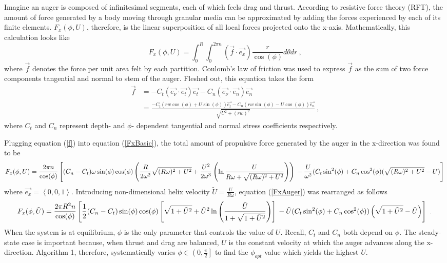 \documentclass[letterpaper, 11 pt]{article}
\begin{document}
\medskip
Imagine an auger is composed of infinitesimal segments, each of which feels drag and thrust. According to resistive force theory (RFT), the amount of force generated by a body moving through granular media can be approximated by adding the forces experienced by each of its finite elements. $F_x(\phi,U)$, therefore, is the linear superposition of all local forces projected onto the x-axis. Mathematically, this calculation looks like
\begin{equation}\label{FxBasic}
F_x(\phi,U) = \int_{0}^{R}\int_{0}^{2\pi n} (\vec{f}\cdot\vec{e_x})\frac{r}{\cos(\phi)} d\theta dr\ \text{,}
\end{equation}
where $\vec{f}$ denotes the force per unit area felt by each partition. Coulomb's law of friction was used to express $\vec{f}$ as the sum of two force components tangential and normal to stem of the auger. Fleshed out, this equation takes the form
\begin{equation}\label{f}
\begin{split} 
\vec{f} &= -C_t(\vec{e_\nu}\cdot\vec{e_t})\vec{e_t}-C_n(\vec{e_\nu}\cdot\vec
{e_n})\vec{e_n} \\
&=\frac{-C_t(rw\cos(\phi)+U\sin(\phi))\vec{e_t}-C_n(rw\sin(\phi)-U\cos(\phi))\vec{e_n}}{\sqrt{U^2+(rw)^2}}\ \text{,}
\end{split} 
\end{equation}
where $C_t$ and $C_n$ represent depth- and $\phi$- dependent tangential and normal stress coefficients respectively. 

Plugging equation (\ref{f}) into equation (\ref{FxBasic}), the total amount of propulsive force generated by the auger in the x-direction was found to be  
\begin{dmath}\label{FxAuger}
F_x(\phi,U) = \frac{2\pi n}{\cos(\phi)}\left[(C_n-C_t)\omega\sin(\phi)\cos(\phi)\left( \frac{R}{2\omega^2}\sqrt{(R\omega)^2+U^2}+\frac{U^2}{2\omega^3}\left( \ln\frac{U}{R\omega+\sqrt{(R\omega)^2+U^2}}\right) \right) \\
- \frac{U}{\omega^2}(C_t\sin^2(\phi)+C_n\cos^2(\phi)(\sqrt{(R\omega)^2+U^2}-U) \right] 
\end{dmath}
where $\vec{e_x} = \left\langle 0,0,1 \right\rangle $. Introducing non-dimensional helix velocity $\tilde{U} = \frac{U}{R\omega}$, equation (\ref{FxAuger}) was rearranged as follows
\begin{dmath}\label{NDFxAuger}
F_x(\phi, \tilde{U}) = \frac{2\pi R^2n}{\cos(\phi)}\left[\frac{1}{2}(C_n-C_t)\sin(\phi)\cos(\phi)\left[\sqrt{1+\tilde{U}^2}+\tilde{U}^2\ln\left(\frac{\tilde{U}}{1+\sqrt{1+\tilde{U}^2}} \right)  \right] \\
- \tilde{U}(C_t\sin^2(\phi)+C_n\cos^2(\phi))\left(\sqrt{1+\tilde{U}^2}-\tilde{U}\right) \right]\ \text{.} 
\end{dmath}
When the system is at equilibrium, $\phi$ is the only parameter that controls the value of $U$. Recall, $C_t$ and $C_n$ both depend on $\phi$. The steady-state case is important because, when thrust and drag are balanced, $U$ is the constant velocity at which the auger advances along the x-direction. Algorithm 1, therefore, systematically varies $\phi\in\left(0,\frac{\pi}{2} \right] $ to find the $\phi_{opt}$ value which yields the highest $U$.  
\end{document}
